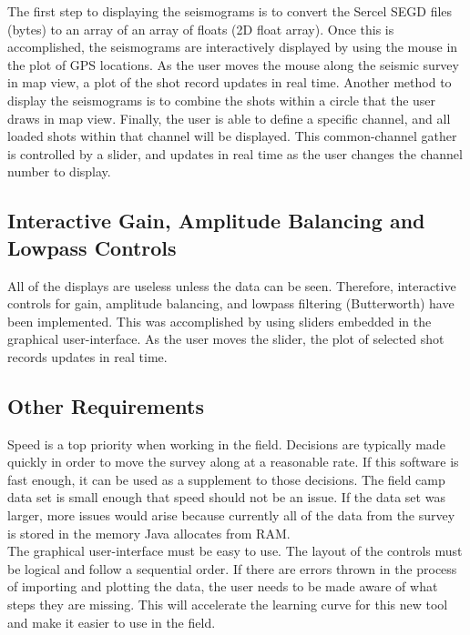 \documentclass[12pt]{article}
\begin{document}
The first step to displaying the seismograms is to convert the Sercel SEGD files (bytes) to an array of an array of floats (2D float array). Once this is accomplished, the seismograms are interactively displayed by using the mouse in the plot of GPS locations. As the user moves the mouse along the seismic survey in map view, a plot of the shot record updates in real time. Another method to display the seismograms is to combine the shots within a circle that the user draws in map view. Finally, the user is able to define a specific channel, and all loaded shots within that channel will be displayed. This common-channel gather is controlled by a slider, and updates in real time as the user changes the channel number to display. \\

\subsection{Interactive Gain, Amplitude Balancing and Lowpass Controls}

All of the displays are useless unless the data can be seen. Therefore, interactive controls for gain, amplitude balancing, and lowpass filtering (Butterworth) have been implemented. This was accomplished by using sliders embedded in the graphical user-interface. As the user moves the slider, the plot of selected shot records updates in real time.

\subsection{Other Requirements}

Speed is a top priority when working in the field. Decisions are typically made quickly in order to move the survey along at a reasonable rate. If this software is fast enough, it can be used as a supplement to those decisions. The field camp data set is small enough that speed should not be an issue. If the data set was larger, more issues would arise because currently all of the data from the survey is stored in the memory Java allocates from RAM.\\

The graphical user-interface must be easy to use. The layout of the controls must be logical and follow a sequential order.  If there are errors thrown in the process of importing and plotting the data, the user needs to be made aware of what steps they are missing. This will accelerate the learning curve for this new tool and make it easier to use in the field.
\end{document}
